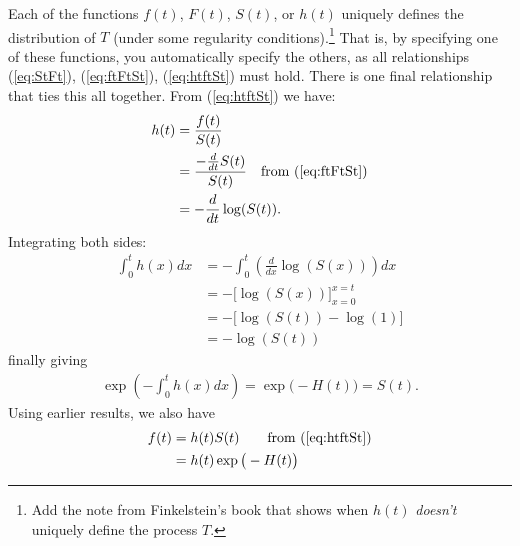 \documentclass[12pt]{article}
\begin{document}

Each of the functions $f(t)$, $F(t)$, $S(t)$, or $h(t)$ uniquely defines the distribution of $T$ (under some regularity conditions).\footnote{Add the note from Finkelstein's book that shows when $h(t)$ \emph{doesn't} uniquely define the process $T$.}
That is, by specifying one of these functions, you automatically specify the others, as all relationships
(\ref{eq:StFt}),
(\ref{eq:ftFtSt}),
(\ref{eq:htftSt}) must hold.
There is one final relationship that ties this all together.
From (\ref{eq:htftSt}) we have:
\begin{align*}
   h(t)
   &= \frac{ f(t) }{ S(t) }  \\
   &= \frac{ - \frac{d}{dt} S(t) }{ S(t) }  \quad
   \text{from (\ref{eq:ftFtSt})} \\
   &= - \frac{d}{dt} \log(S(t))
   \text{.}
\end{align*}
Integrating both sides:
\begin{align*}
  \int_{0}^{t}{ h(x) dx }
   &= - \int_{0}^{t}{ \left( \frac{d}{dx} \log(S(x)) \right) dx } \\
   &= -  \bigg[  \log(S(x)) \bigg]_{x=0}^{x=t}    \\
   &= - \big[ \log(S(t)) - \log(1) \big]  \\
   &= - \log(S(t))
\end{align*}
finally giving
\begin{align*}
   \exp\left(- \int_{0}^{t}{ h(x) dx } \right)
   =
   \exp\big( -H(t) \big)
   =
   S(t)
   \text{.}
\end{align*}
Using earlier results, we also have
\begin{align*}
f(t)
&= h(t)S(t) \qquad \text{from (\ref{eq:htftSt})} \\
&= h(t) \exp\big( -H(t) \big)
\end{align*}
\end{document}
